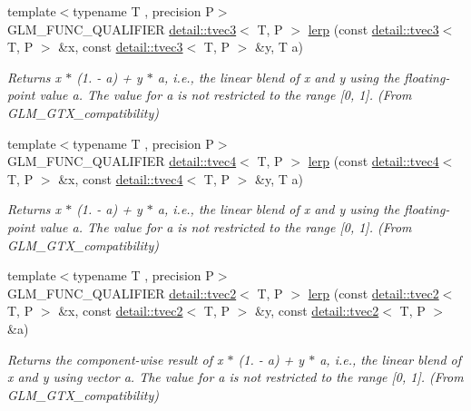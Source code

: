 \begin{DoxyCompactItemize}
{\footnotesize template$<$typename T , precision P$>$ }\\G\+L\+M\+\_\+\+F\+U\+N\+C\+\_\+\+Q\+U\+A\+L\+I\+F\+I\+ER \hyperlink{structglm_1_1detail_1_1tvec3}{detail\+::tvec3}$<$ T, P $>$ \hyperlink{group__gtx__compatibility_ga5680b8166d1d6a5fa70cbfb56345a5e6}{lerp} (const \hyperlink{structglm_1_1detail_1_1tvec3}{detail\+::tvec3}$<$ T, P $>$ \&x, const \hyperlink{structglm_1_1detail_1_1tvec3}{detail\+::tvec3}$<$ T, P $>$ \&y, T a)
\begin{DoxyCompactList}\small\item\em Returns x $\ast$ (1. -\/ a) + y $\ast$ a, i.\+e., the linear blend of x and y using the floating-\/point value a. The value for a is not restricted to the range \mbox{[}0, 1\mbox{]}. (From G\+L\+M\+\_\+\+G\+T\+X\+\_\+compatibility) \end{DoxyCompactList}\item 
{\footnotesize template$<$typename T , precision P$>$ }\\G\+L\+M\+\_\+\+F\+U\+N\+C\+\_\+\+Q\+U\+A\+L\+I\+F\+I\+ER \hyperlink{structglm_1_1detail_1_1tvec4}{detail\+::tvec4}$<$ T, P $>$ \hyperlink{group__gtx__compatibility_ga063de7edddb13ecc44fcfddd9bf38111}{lerp} (const \hyperlink{structglm_1_1detail_1_1tvec4}{detail\+::tvec4}$<$ T, P $>$ \&x, const \hyperlink{structglm_1_1detail_1_1tvec4}{detail\+::tvec4}$<$ T, P $>$ \&y, T a)
\begin{DoxyCompactList}\small\item\em Returns x $\ast$ (1. -\/ a) + y $\ast$ a, i.\+e., the linear blend of x and y using the floating-\/point value a. The value for a is not restricted to the range \mbox{[}0, 1\mbox{]}. (From G\+L\+M\+\_\+\+G\+T\+X\+\_\+compatibility) \end{DoxyCompactList}\item 
{\footnotesize template$<$typename T , precision P$>$ }\\G\+L\+M\+\_\+\+F\+U\+N\+C\+\_\+\+Q\+U\+A\+L\+I\+F\+I\+ER \hyperlink{structglm_1_1detail_1_1tvec2}{detail\+::tvec2}$<$ T, P $>$ \hyperlink{group__gtx__compatibility_ga9cc12766a2675ce054a30b0cab4b567b}{lerp} (const \hyperlink{structglm_1_1detail_1_1tvec2}{detail\+::tvec2}$<$ T, P $>$ \&x, const \hyperlink{structglm_1_1detail_1_1tvec2}{detail\+::tvec2}$<$ T, P $>$ \&y, const \hyperlink{structglm_1_1detail_1_1tvec2}{detail\+::tvec2}$<$ T, P $>$ \&a)
\begin{DoxyCompactList}\small\item\em Returns the component-\/wise result of x $\ast$ (1. -\/ a) + y $\ast$ a, i.\+e., the linear blend of x and y using vector a. The value for a is not restricted to the range \mbox{[}0, 1\mbox{]}. (From G\+L\+M\+\_\+\+G\+T\+X\+\_\+compatibility) \end{DoxyCompactList}\item 

\end{DoxyCompactItemize}
